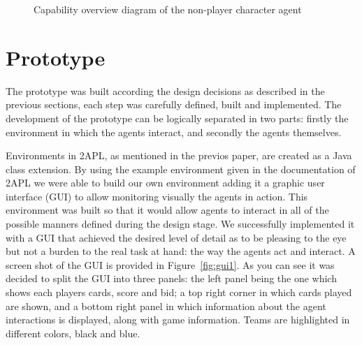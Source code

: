 \documentclass[a4paper]{article}
\begin{document}
\begin{figure}[htp]
  \label{fig:non-player-cap}
  \caption{Capability overview diagram of the non-player character agent}
\end{figure}

\section{Prototype}\label{sec:proto} 

The prototype was built according the design decisions as described in the previous sections, each step was carefully defined, built and implemented. %
The development of the prototype can be logically separated in two parts: firstly the environment in which the agents interact, and secondly the agents themselves.

Environments in 2APL, as mentioned in the previos paper, are created as a Java class extension. By using the example environment given in the documentation of 2APL we were able to build our own environment adding it a graphic user interface (GUI) to allow monitoring visually the agents in action. This environment was built so that it would allow agents to interact in all of the possible manners defined during the design stage. We successfully implemented it with a GUI that achieved the desired level of detail as to be pleasing to the eye but not a burden to the real task at hand: the way the agents act and interact. A screen shot of the GUI is provided in Figure~\ref{fig:gui1}. As you can see it was decided to split the GUI into three panels: the left panel being the one which shows each players cards, score and bid; a top right corner in which cards played are shown, and a bottom right panel in which information about the agent interactions is displayed, along with game information. Teams are highlighted in different colors, black and blue.
\end{document}
